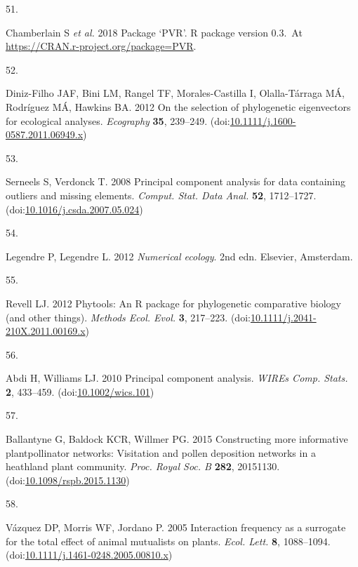 \documentclass[
  12pt,
  a4paper,
]{article}
\newlength{\cslhangindent}
\newlength{\csllabelwidth}
\newlength{\cslentryspacingunit} %
\newenvironment{CSLReferences}[2] %
 {%
  \setlength{\parindent}{0pt}
  \ifodd #1
  \let\oldpar\par
  \def\par{\hangindent=\cslhangindent\oldpar}
  \fi
  \setlength{\parskip}{#2\cslentryspacingunit}
 }%
 {}
\newcommand{\CSLLeftMargin}[1]{\parbox[t]{\csllabelwidth}{#1}}
\newcommand{\CSLRightInline}[1]{\parbox[t]{\linewidth - \csllabelwidth}{#1}\break}
\begin{document}
\begin{CSLReferences}{0}{0}
\leavevmode{}%
\CSLLeftMargin{51. }
\CSLRightInline{Chamberlain S \emph{et al.} 2018 Package {`{PVR}'}. R package version 0.3.~At \href{https://CRAN.R-project.org/package=PVR}{https://CRAN.r-project.org/package=PVR}. }

\leavevmode{}%
\CSLLeftMargin{52. }
\CSLRightInline{Diniz-Filho JAF, Bini LM, Rangel TF, Morales-Castilla I, Olalla-Tárraga MÁ, Rodríguez MÁ, Hawkins BA. 2012 On the selection of phylogenetic eigenvectors for ecological analyses. \emph{Ecography} \textbf{35}, 239--249. (doi:\href{https://doi.org/10.1111/j.1600-0587.2011.06949.x}{10.1111/j.1600-0587.2011.06949.x})}

\leavevmode{}%
\CSLLeftMargin{53. }
\CSLRightInline{Serneels S, Verdonck T. 2008 Principal component analysis for data containing outliers and missing elements. \emph{Comput. Stat. Data Anal.} \textbf{52}, 1712--1727. (doi:\href{https://doi.org/10.1016/j.csda.2007.05.024}{10.1016/j.csda.2007.05.024})}

\leavevmode{}%
\CSLLeftMargin{54. }
\CSLRightInline{Legendre P, Legendre L. 2012 \emph{Numerical ecology}. {2nd edn}. {Elsevier, Amsterdam}. }

\leavevmode{}%
\CSLLeftMargin{55. }
\CSLRightInline{Revell LJ. 2012 Phytools: An {R} package for phylogenetic comparative biology (and other things). \emph{Methods Ecol. Evol.} \textbf{3}, 217--223. (doi:\href{https://doi.org/10.1111/j.2041-210X.2011.00169.x}{10.1111/j.2041-210X.2011.00169.x})}

\leavevmode{}%
\CSLLeftMargin{56. }
\CSLRightInline{Abdi H, Williams LJ. 2010 Principal component analysis. \emph{WIREs Comp. Stats.} \textbf{2}, 433--459. (doi:\href{https://doi.org/10.1002/wics.101}{10.1002/wics.101})}

\leavevmode{}%
\CSLLeftMargin{57. }
\CSLRightInline{Ballantyne G, Baldock KCR, Willmer PG. 2015 Constructing more informative plant\textendash pollinator networks: Visitation and pollen deposition networks in a heathland plant community. \emph{Proc. Royal Soc. B} \textbf{282}, 20151130. (doi:\href{https://doi.org/10.1098/rspb.2015.1130}{10.1098/rspb.2015.1130})}

\leavevmode{}%
\CSLLeftMargin{58. }
\CSLRightInline{Vázquez DP, Morris WF, Jordano P. 2005 Interaction frequency as a surrogate for the total effect of animal mutualists on plants. \emph{Ecol. Lett.} \textbf{8}, 1088--1094. (doi:\href{https://doi.org/10.1111/j.1461-0248.2005.00810.x}{10.1111/j.1461-0248.2005.00810.x})}


\end{CSLReferences}
\end{document}
